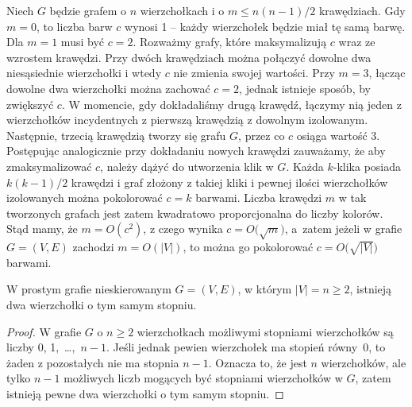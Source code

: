 Niech $G$ będzie grafem o $n$ wierzchołkach i o $m\le n(n-1)/2$ krawędziach. Gdy $m=0$, to liczba barw $c$ wynosi 1 -- każdy wierzchołek będzie miał tę samą barwę. Dla $m=1$ musi być $c=2$. Rozważmy grafy, które maksymalizują $c$ wraz ze wzrostem krawędzi. Przy dwóch krawędziach można połączyć dowolne dwa niesąsiednie wierzchołki i wtedy $c$ nie zmienia swojej wartości. Przy $m=3$, łącząc dowolne dwa wierzchołki można zachować $c=2$, jednak istnieje sposób, by zwiększyć $c$. W momencie, gdy dokładaliśmy drugą krawędź, łączymy nią jeden z wierzchołków incydentnych z pierwszą krawędzią z dowolnym izolowanym. Następnie, trzecią krawędzią tworzy się  grafu $G$, przez co $c$ osiąga wartość 3. Postępując analogicznie przy dokładaniu nowych krawędzi zauważamy, że aby zmaksymalizować $c$, należy dążyć do utworzenia klik w $G$. Każda $k$-klika posiada $k(k-1)/2$ krawędzi i graf złożony z takiej kliki i pewnej ilości wierzchołków izolowanych można pokolorować $c=k$ barwami. Liczba krawędzi $m$ w tak tworzonych grafach jest zatem kwadratowo proporcjonalna do liczby kolorów. Stąd mamy, że $m=O(c^2)$, z czego wynika $c=O\bigl(\!\sqrt{m}\bigr)$, a~zatem jeżeli w grafie $G=(V,E)$ zachodzi $m=O(|V|)$, to można go pokolorować $c=O\bigl(\!\sqrt{|V|}\bigr)$ barwami.

\subexercise{} %
\begin{twierdzenie}
	W prostym grafie nieskierowanym $G=(V,E)$, w którym $|V|=n\ge2$, istnieją dwa wierzchołki o tym samym stopniu.
\end{twierdzenie}
\begin{proof}
W grafie $G$ o $n\ge2$ wierzchołkach możliwymi stopniami wierzchołków są liczby 0, 1,~\dots,~$n-1$. Jeśli jednak pewien wierzchołek ma stopień równy~0, to żaden z pozostałych nie ma stopnia $n-1$. Oznacza to, że jest $n$ wierzchołków, ale tylko $n-1$ możliwych liczb mogących być stopniami wierzchołków w $G$, zatem istnieją pewne dwa wierzchołki o tym samym stopniu.
\end{proof}

